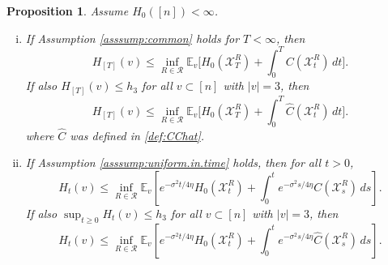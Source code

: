 \documentclass[11pt,reqno]{amsart}
\numberwithin{equation}{section}
\newtheorem{proposition}[theorem]{Proposition}
\theoremstyle{definition}
\def\CC{{C}}
\def\E{{\mathbb E}}
\def\X{{\mathcal X}}
\begin{document}
\begin{proposition} \label{pr:CTMC-selfimproved}
Assume $H_0([n]) < \infty$.
\begin{enumerate}[(i)]
\item If Assumption \ref{asssump:common} holds for $T < \infty$, then
	\begin{equation*}
	H_{[T]}(v) \le\inf_{R \in \mathcal{R}}\E_v\bigg[H_0(\X^{R}_T) + \int_0^T \CC(\X^{R}_t)\, dt\bigg].
	\end{equation*}
	If also $H_{[T]}(v) \le h_3$ for all $v \subset [n]$ with $|v|=3$, then 
\begin{equation*}
	H_{[T]}(v) \le\inf_{R \in \mathcal{R}}\E_v\bigg[H_0(\X^{R}_T) + \int_0^T \widehat{\CC}(\X^{R}_t)\, dt\bigg].
\end{equation*}
	where $\widehat{\CC}$ was defined in \eqref{def:CChat}.
	\item If Assumption \ref{asssump:uniform.in.time} holds, then for all $t > 0$, 
	\begin{equation*} 
	H_t(v)  \le \inf_{R \in \mathcal{R}} \E_v \left[ e^{-\sigma^2t/4\eta} H_0(\X^{R}_t) + \int_0^t e^{-\sigma^2s/4\eta } \CC(\X^{R}_s) \, ds\right].
	\end{equation*} 
	If also $\sup_{t \ge 0}H_t(v) \le h_3$ for all $v \subset [n]$ with $|v|=3$, then 
	\begin{equation*} 
	H_t(v)  \le \inf_{R \in \mathcal{R}} \E_v \left[ e^{-\sigma^2t/4\eta} H_0(\X^{R}_t) + \int_0^t e^{-\sigma^2s/4\eta } \widehat{\CC}(\X^{R}_s) \, ds\right].
\end{equation*} 
\end{enumerate} 
\end{proposition}
\end{document}
